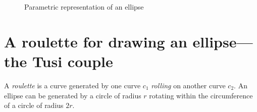 \begin{figure}[b]
\begin{center}
\caption{Parametric representation of an ellipse}\label{f.parametric1}
\end{center}
\end{figure}


\section{A roulette for drawing an ellipse---the Tusi couple}\label{s.roulette}

A \emph{roulette} is a curve generated by one curve $c_1$ \emph{rolling} on another curve $c_2$. An ellipse can be generated by a circle of radius $r$ rotating within the circumference of a circle of radius $2r$.


